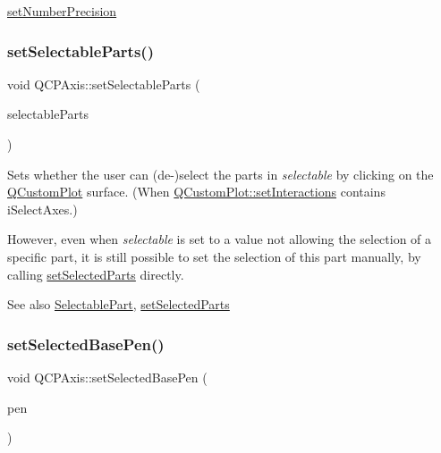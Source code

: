 \hyperlink{class_q_c_p_axis_a21dc8023ad7500382ad9574b48137e63}{set\+Number\+Precision} \mbox{\label{class_q_c_p_axis_a513f9b9e326c505d9bec54880031b085}} 
\subsubsection{\texorpdfstring{set\+Selectable\+Parts()}{setSelectableParts()}}
{\footnotesize\ttfamily void Q\+C\+P\+Axis\+::set\+Selectable\+Parts (\begin{DoxyParamCaption}\item[{const Q\+C\+P\+Axis\+::\+Selectable\+Parts \&}]{selectable\+Parts }\end{DoxyParamCaption})}

Sets whether the user can (de-\/)select the parts in {\itshape selectable} by clicking on the \hyperlink{class_q_custom_plot}{Q\+Custom\+Plot} surface. (When \hyperlink{class_q_custom_plot_a5ee1e2f6ae27419deca53e75907c27e5}{Q\+Custom\+Plot\+::set\+Interactions} contains i\+Select\+Axes.)

However, even when {\itshape selectable} is set to a value not allowing the selection of a specific part, it is still possible to set the selection of this part manually, by calling \hyperlink{class_q_c_p_axis_ab9d7a69277dcbed9119b3c1f25ca19c3}{set\+Selected\+Parts} directly.

\begin{DoxySeeAlso}{See also}
\hyperlink{class_q_c_p_axis_abee4c7a54c468b1385dfce2c898b115f}{Selectable\+Part}, \hyperlink{class_q_c_p_axis_ab9d7a69277dcbed9119b3c1f25ca19c3}{set\+Selected\+Parts} 
\end{DoxySeeAlso}
\mbox{\label{class_q_c_p_axis_aeb917a909215605b95ef2be843de1ee8}} 
\subsubsection{\texorpdfstring{set\+Selected\+Base\+Pen()}{setSelectedBasePen()}}
{\footnotesize\ttfamily void Q\+C\+P\+Axis\+::set\+Selected\+Base\+Pen (\begin{DoxyParamCaption}\item[{const Q\+Pen \&}]{pen }\end{DoxyParamCaption})}

